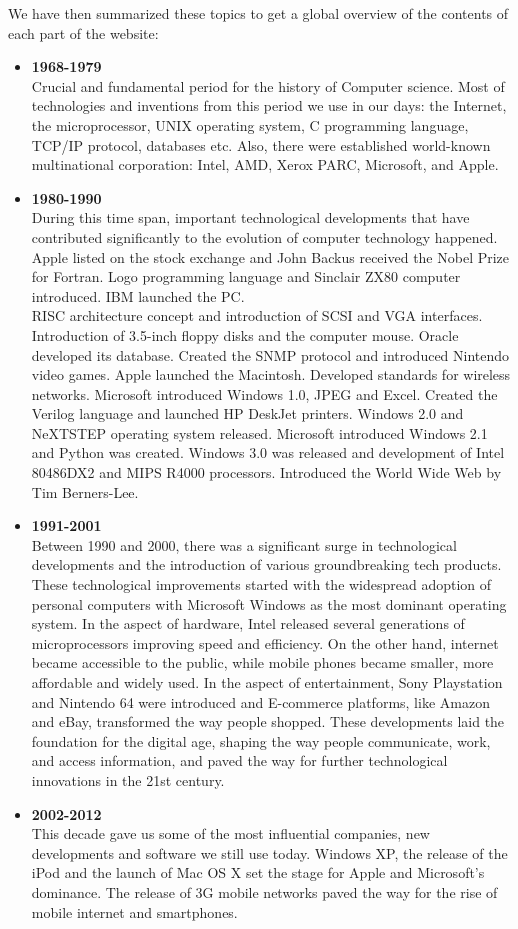 \documentclass{article}
\begin{document}
    \noindent We have then summarized these topics to get a global overview of the contents of each part of the website:
    \begin{itemize}
    	\item \textbf{1968-1979} \\ Crucial and fundamental period for the history of Computer science. Most of technologies and inventions from this period we use in our days: the Internet, the microprocessor, UNIX operating system, C programming language, TCP/IP protocol, databases etc. Also, there were established world-known multinational corporation: Intel, AMD, Xerox PARC, Microsoft, and Apple. 
	\item \textbf{1980-1990} \\ During this time span, important technological developments that have contributed significantly to the evolution of computer technology happened. Apple listed on the stock exchange and John Backus received the Nobel Prize for Fortran. Logo programming language and Sinclair ZX80 computer introduced. IBM launched the PC. 
	\\ RISC architecture concept and introduction of SCSI and VGA interfaces. Introduction of 3.5-inch floppy disks and the computer mouse. Oracle developed its database. Created the SNMP protocol and introduced Nintendo video games. Apple launched the Macintosh. Developed standards for wireless networks. Microsoft introduced Windows 1.0, JPEG and Excel. Created the Verilog language and launched HP DeskJet printers. Windows 2.0 and NeXTSTEP operating system released. Microsoft introduced Windows 2.1 and Python was created. Windows 3.0 was released and development of Intel 80486DX2 and MIPS R4000 processors. Introduced the World Wide Web by Tim Berners-Lee. 
	\item \textbf{1991-2001} \\ Between 1990 and 2000, there was a significant surge in technological developments and the introduction of various groundbreaking tech products. These technological improvements started with the widespread adoption of personal computers with Microsoft Windows as the most dominant operating system. In the aspect of hardware, Intel released several generations of microprocessors improving speed and efficiency. On the other hand, internet became accessible to the public, while mobile phones became smaller, more affordable and widely used. In the aspect of entertainment, Sony Playstation and Nintendo 64 were introduced and E-commerce platforms, like Amazon and eBay, transformed the way people shopped. These developments laid the foundation for the digital age, shaping the way people communicate, work, and access information, and paved the way for further technological innovations in the 21st century.	\item \textbf{2002-2012} \\ This decade gave us some of the most influential companies, new developments and software we still use today. Windows XP, the release of the iPod and the launch of Mac OS X set the stage for Apple and Microsoft's dominance. The release of 3G mobile networks paved the way for the rise of mobile internet and smartphones. \\

\end{itemize}
\end{document}
